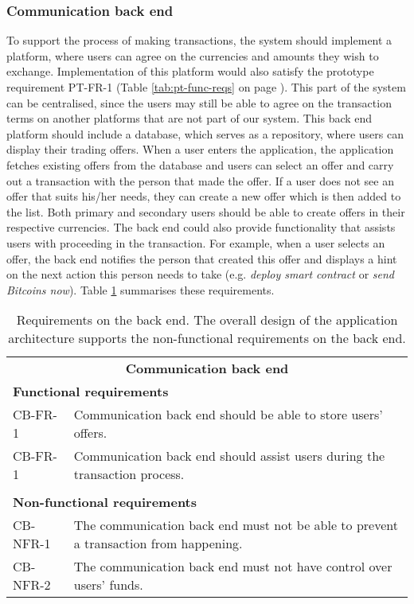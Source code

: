 \subsubsection{Communication back end}
To support the process of making transactions, the system should implement a platform, where users can agree on the currencies and amounts they wish to exchange. Implementation of this platform would also satisfy the prototype requirement PT-FR-1 (Table \ref{tab:pt-func-reqs} on page \pageref{tab:pt-func-reqs}). This part of the system can be centralised, since the users may still be able to agree on the transaction terms on another platforms that are not part of our system. This back end platform should include a database, which serves as a repository, where users can display their trading offers. When a user enters the application, the application fetches existing offers from the database and users can select an offer and carry out a transaction with the person that made the offer. If a user does not see an offer that suits his/her needs, they can create a new offer which is then added to the list. Both primary and secondary users should be able to create offers in their respective currencies. The back end could also provide functionality that assists users with proceeding in the transaction. For example, when a user selects an offer, the back end notifies the person that created this offer and displays a hint on the next action this person needs to take (e.g. \textit{deploy smart contract} or \textit{send Bitcoins now}). Table \ref{tab:reqs-back-end} summarises these requirements.

\begin{table}[ht]
    \centering
    \begin{tabularx}{\textwidth}{|l X|}
    \hline
        \multicolumn{2}{|c|}{\textbf{Communication back end}}\\
        \multicolumn{2}{|l|}{\textbf{Functional requirements}}\\
        CB-FR-1&Communication back end should be able to store users' offers.\\
        CB-FR-1&Communication back end should assist users during the transaction process.\\
        &\\
        \multicolumn{2}{|l|}{\textbf{Non-functional requirements}}\\
        CB-NFR-1&The communication back end must not be able to prevent a transaction from happening.\\
        CB-NFR-2&The communication back end must not have control over users' funds.\\
    \hline
    \end{tabularx}
    \caption{Requirements on the back end. The overall design of the application architecture supports the non-functional requirements on  the back end.}
    \label{tab:reqs-back-end}
\end{table}